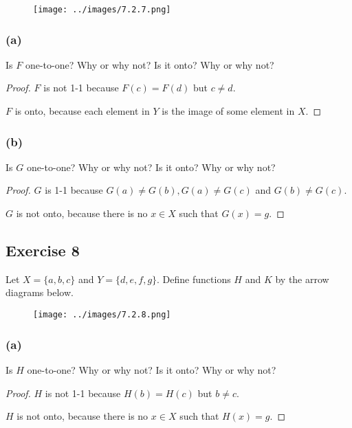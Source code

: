\documentclass[14pt]{extarticle}
\begin{document}
\begin{figure}[ht!]
    \centering
    \texttt{[image: ../images/7.2.7.png]}
\end{figure}

\subsubsection{(a)}
Is $F$ one-to-one? Why or why not? Is it onto? Why or why not?

\begin{proof}
    $F$ is not 1-1 because $F(c) = F(d)$ but $c \neq d$.

    $F$ is onto, because each element in $Y$ is the image of some element in $X$.
\end{proof}

\subsubsection{(b)}
Is $G$ one-to-one? Why or why not? Is it onto? Why or why not?

\begin{proof}
    $G$ is 1-1 because $G(a) \neq G(b), G(a) \neq G(c)$ and $G(b) \neq G(c)$.

    $G$ is not onto, because there is no $x \in X$ such that $G(x) = g$.
\end{proof}

\subsection{Exercise 8}
Let \(X = \{a, b, c\}\) and \(Y = \{d, e, f, g\}\). Define
functions $H$ and $K$ by the arrow diagrams below.

\begin{figure}[ht!]
    \centering
    \texttt{[image: ../images/7.2.8.png]}
\end{figure}

\subsubsection{(a)}
Is $H$ one-to-one? Why or why not? Is it onto? Why or why not?

\begin{proof}
    $H$ is not 1-1 because \(H(b) = H(c)\) but \(b \neq c\).

    $H$ is not onto, because there is no $x \in X$ such that $H(x) = g$.
\end{proof}
\end{document}
